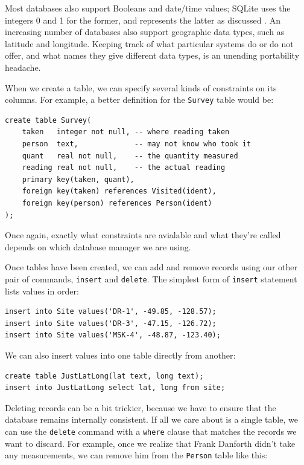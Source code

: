 \documentclass{book}
\begin{document}
Most databases also support Booleans and date/time values; SQLite uses
the integers 0 and 1 for the former, and represents the latter as
discussed . An increasing number of databases
also support geographic data types, such as latitude and longitude.
Keeping track of what particular systems do or do not offer, and what
names they give different data types, is an unending portability
headache.

When we create a table, we can specify several kinds of constraints on
its columns. For example, a better definition for the \texttt{Survey}
table would be:

\begin{verbatim}
create table Survey(
    taken   integer not null, -- where reading taken
    person  text,             -- may not know who took it
    quant   real not null,    -- the quantity measured
    reading real not null,    -- the actual reading
    primary key(taken, quant),
    foreign key(taken) references Visited(ident),
    foreign key(person) references Person(ident)
);
\end{verbatim}

Once again, exactly what constraints are avialable and what they're
called depends on which database manager we are using.

Once tables have been created, we can add and remove records using our
other pair of commands, \texttt{insert} and \texttt{delete}. The
simplest form of \texttt{insert} statement lists values in order:

\begin{verbatim}
insert into Site values('DR-1', -49.85, -128.57);
insert into Site values('DR-3', -47.15, -126.72);
insert into Site values('MSK-4', -48.87, -123.40);
\end{verbatim}

We can also insert values into one table directly from another:

\begin{verbatim}
create table JustLatLong(lat text, long text);
insert into JustLatLong select lat, long from site;
\end{verbatim}

Deleting records can be a bit trickier, because we have to ensure that
the database remains internally consistent. If all we care about is a
single table, we can use the \texttt{delete} command with a
\texttt{where} clause that matches the records we want to discard. For
example, once we realize that Frank Danforth didn't take any
measurements, we can remove him from the \texttt{Person} table like
this:
\end{document}
